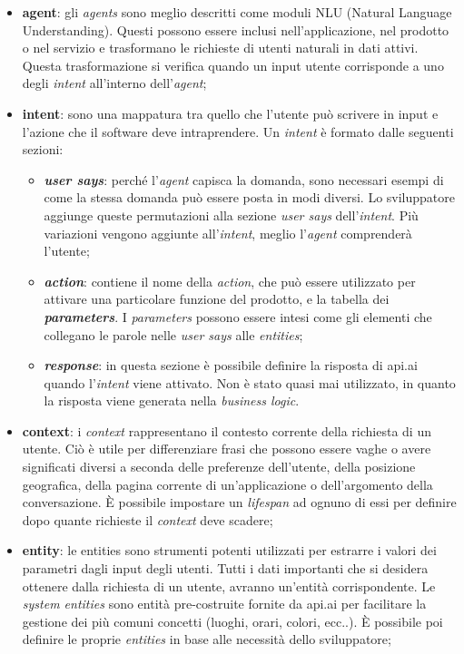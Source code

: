 \begin{itemize}
	\item \textbf{agent}: gli \emph{agents} sono meglio descritti come moduli NLU (Natural Language Understanding). Questi possono essere inclusi nell'applicazione, nel prodotto o nel servizio e trasformano le richieste di utenti naturali in dati attivi. Questa trasformazione si verifica quando un input utente corrisponde a uno degli \emph{intent} all'interno dell'\emph{agent};
	\item \textbf{intent}: sono una mappatura tra quello che l'utente può scrivere in input e l'azione che il software deve intraprendere. Un \emph{intent} è formato dalle seguenti sezioni:
	\begin{itemize}
		\item\textbf{ \emph{user says}}: perché l'\emph{agent} capisca la domanda, sono necessari esempi di come la stessa domanda può essere posta in modi diversi. Lo sviluppatore aggiunge queste permutazioni alla sezione \emph{user says} dell'\emph{intent}. Più variazioni vengono aggiunte all'\emph{intent}, meglio l'\emph{agent} comprenderà l'utente;
		\item \textbf{\emph{action}}: contiene il nome della \emph{action}, che può essere utilizzato per attivare una particolare funzione del prodotto, e la tabella dei \textbf{\emph{parameters}}. I \emph{parameters} possono essere intesi come gli elementi che collegano le parole nelle \emph{user says} alle \emph{entities};
		\item \textbf{\emph{response}}: in questa sezione è possibile definire la risposta di api.ai quando l'\emph{intent} viene attivato. Non è stato quasi mai utilizzato, in quanto la risposta viene generata nella \emph{business logic}.
	\end{itemize}
	\item \textbf{context}: i \emph{context} rappresentano il contesto corrente della richiesta di un utente. Ciò è utile per differenziare frasi che possono essere vaghe o avere significati diversi a seconda delle preferenze dell'utente, della posizione geografica, della pagina corrente di un'applicazione o dell'argomento della conversazione. È possibile impostare un \emph{lifespan} ad ognuno di essi per definire dopo quante richieste il \emph{context} deve scadere;
	\item \textbf{entity}: le entities sono strumenti potenti utilizzati per estrarre i valori dei parametri dagli input degli utenti. Tutti i dati importanti che si desidera ottenere dalla richiesta di un utente, avranno un'entità corrispondente. Le \emph{system entities} sono entità pre-costruite fornite da api.ai per facilitare la gestione dei più comuni concetti (luoghi, orari, colori, ecc..). È possibile poi definire le proprie \emph{entities} in base alle necessità dello sviluppatore;
\end{itemize}


